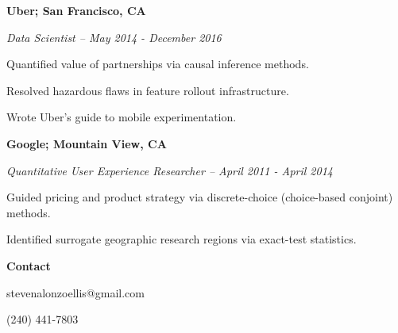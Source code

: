 \documentclass[12pt]{res}
\begin{document}
{\begin{resume}
\begin{minipage}{7.6in}
\vspace{2mm}
\textbf{Uber; San Francisco, CA}

{\it Data Scientist -- May  2014 - December  2016}
\vspace{0.5mm}
\begin{list}{}{\leftmargin=1em}\itemsep-2pt
\item Quantified value of partnerships via causal inference methods.
\item Resolved hazardous flaws in feature rollout infrastructure.
\item Wrote Uber's guide to mobile experimentation.
\end{list}

\vspace{2mm}
\textbf{Google; Mountain View, CA}

{\it Quantitative User Experience Researcher -- April  2011 - April  2014}  
\vspace{0.5mm}
\begin{list}{}{\leftmargin=1em}\itemsep-2pt
\item Guided pricing and product strategy via discrete-choice (choice-based conjoint) methods.
\item Identified surrogate geographic research regions via exact-test statistics.
\end{list}

\vspace{2mm}

\textbf{Contact\hspace{1mm}}\hrulefill
\vspace{2mm}
\begin{list}{}{\leftmargin=0em}\itemsep-2pt
\item stevenalonzoellis@gmail.com
\item (240) 441-7803
\end{list}


\end{minipage}
\end{resume}
} %
\end{document}
